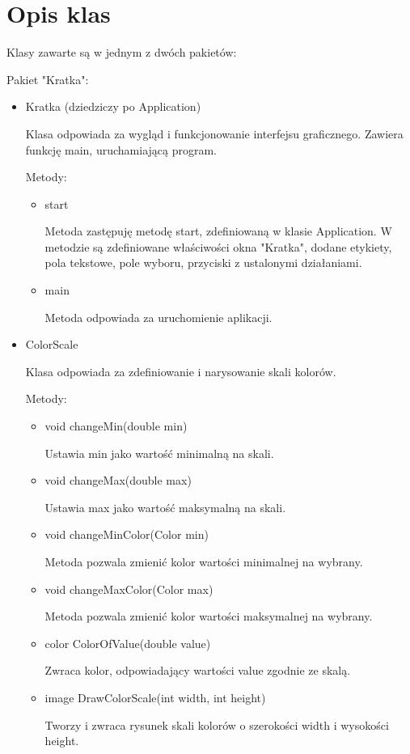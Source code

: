 \documentclass[]{article}
\begin{document}
\section{Opis klas}\label{header-n233}
Klasy zawarte są w jednym z dwóch pakietów:

Pakiet "Kratka":
\begin{itemize}
    \item Kratka (dziedziczy po Application)
    
    Klasa odpowiada za wygląd i funkcjonowanie interfejsu graficznego. Zawiera funkcję main, uruchamiającą program. 
    
    Metody:
    \begin{itemize}
        \item start
        
        Metoda zastępuję metodę start, zdefiniowaną w klasie Application. W metodzie są zdefiniowane właściwości okna "Kratka", dodane etykiety, pola tekstowe, pole wyboru, przyciski z ustalonymi działaniami. 
        \item main
        
        Metoda odpowiada za uruchomienie aplikacji.
        
    \end{itemize}
    \item ColorScale
    
    Klasa odpowiada za zdefiniowanie i narysowanie skali kolorów.
    
    Metody:
    \begin{itemize}
    \item void changeMin(double min)
    
    Ustawia min jako wartość minimalną na skali. 
    \item void changeMax(double max)
    
    Ustawia max jako wartość maksymalną na skali.
    
    \item void changeMinColor(Color min)
    
    Metoda pozwala zmienić kolor wartości minimalnej na wybrany.
    \item void changeMaxColor(Color max)
    
    Metoda pozwala zmienić kolor wartości maksymalnej na wybrany.
    \item color ColorOfValue(double value)
    
    Zwraca kolor, odpowiadający wartości value zgodnie ze skalą.
    \item image DrawColorScale(int width, int height)
    
    Tworzy i zwraca rysunek skali kolorów o szerokości width i wysokości height. 
    \end{itemize}
\end{itemize}
\end{document}
